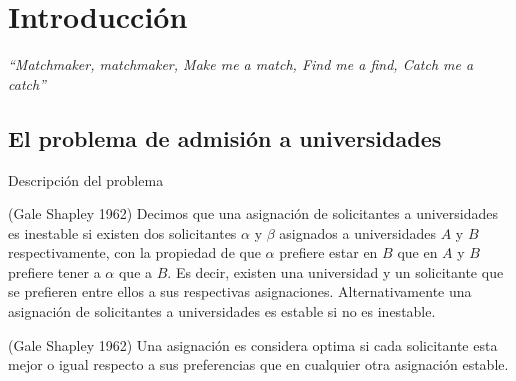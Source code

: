 \chapter{Introducción}
\begin{flushright}
\textit{``Matchmaker, matchmaker,
Make me a match, Find me a find,
Catch me a catch''}
\end{flushright}
\section{El problema de admisión a universidades}
Descripción del problema



\begin{dfn}{(Gale Shapley 1962)}
\label{Estable}
Decimos que una asignación de solicitantes a universidades es inestable si existen dos solicitantes $\alpha$ y $\beta$ asignados a  universidades $A$ y $B$ respectivamente, con la propiedad de que $\alpha$ prefiere estar en $B$ que en $A$ y $B$ prefiere tener a $\alpha$ que a $B$. Es decir, existen una universidad y un solicitante que se prefieren entre ellos a sus respectivas asignaciones. Alternativamente una asignación de solicitantes a universidades es estable si no es inestable.
\end{dfn}

\begin{dfn}{(Gale Shapley 1962)}
\label{optima}
Una asignación es considera optima si cada solicitante esta mejor o igual respecto a sus preferencias que en cualquier otra asignación estable. 
\end{dfn}




